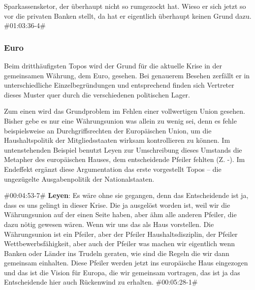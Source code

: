 \begin{description}
\begin{linenumbers}[1]
Sparkassensketor, der überhaupt nicht so rumgezockt hat. Wieso er sich jetzt so vor die privaten Banken stellt, da hat er eigentlich überhaupt keinen Grund dazu. \#01:03:36-4\#
	\end{linenumbers}
	\label{lis:23}
\end{description}

\subsubsection{Euro}

Beim dritthäufigsten Topos wird der Grund für die aktuelle Krise in der gemeinsamen Währung, dem Euro, gesehen. Bei genauerem Besehen zerfällt er in unterschiedliche Einzelbegründungen und entsprechend finden sich Vertreter dieses Muster quer durch die verschiedenen politischen Lager.

Zum einen wird das Grundproblem im Fehlen einer vollwertigen Union gesehen. Bisher gebe es nur eine Währungsunion was allein zu wenig sei, denn es fehle beispielsweise an Durchgriffsrechten der Europäischen Union, um die Haushaltspolitik der Mitgliedsstaaten wirksam kontrollieren zu können. Im untenstehenden Beispiel benutzt Leyen zur Umschreibung dieses Umstands die Metapher des europäischen Hauses, dem entscheidende Pfeiler fehlten (Z. -). Im Endeffekt ergänzt diese Argumentation das erste vorgestellt Topos – die ungezügelte Ausgabenpolitik der Nationalstaaten.

\begin{description}
	\begin{linenumbers}[1]
		\item \#00:04:53-7\# \textbf{Leyen}: Es wäre ohne sie gegangen, denn das Entscheidende ist ja, dass es uns gelingt in dieser Krise. Die ja ausgelöst worden ist, weil wir die Währungsunion auf der einen Seite haben, aber ähm alle anderen Pfeiler, die dazu nötig gewesen wären. Wenn wir uns das als Haus vorstellen. Die Währungsunion ist ein Pfeiler, aber der Pfeiler Haushaltsdisziplin, der Pfeiler Wettbewerbsfähigkeit, aber auch der Pfeiler was machen wir eigentlich wenn Banken oder Länder ins Trudeln geraten, wie sind die Regeln die wir dann gemeinsam einhalten. Diese Pfeiler werden jetzt ins europäische Haus eingezogen und das ist die Vision für Europa, die wir gemeinsam vortragen, das ist ja das Entscheidende hier auch Rückenwind zu erhalten. \#00:05:28-1\#
	\end{linenumbers}
\end{description}

